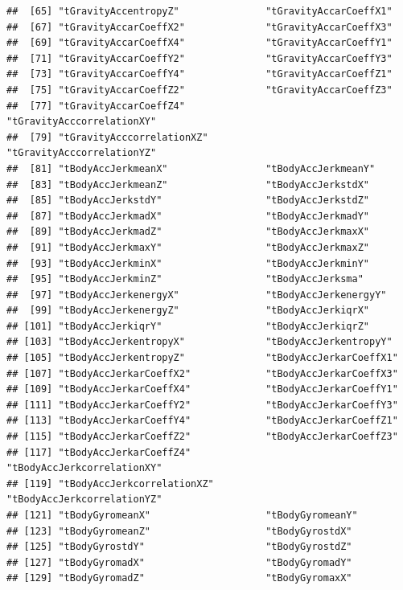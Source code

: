 \documentclass[
]{article}
\begin{document}
\begin{verbatim}
##  [65] "tGravityAccentropyZ"               "tGravityAccarCoeffX1"             
##  [67] "tGravityAccarCoeffX2"              "tGravityAccarCoeffX3"             
##  [69] "tGravityAccarCoeffX4"              "tGravityAccarCoeffY1"             
##  [71] "tGravityAccarCoeffY2"              "tGravityAccarCoeffY3"             
##  [73] "tGravityAccarCoeffY4"              "tGravityAccarCoeffZ1"             
##  [75] "tGravityAccarCoeffZ2"              "tGravityAccarCoeffZ3"             
##  [77] "tGravityAccarCoeffZ4"              "tGravityAcccorrelationXY"         
##  [79] "tGravityAcccorrelationXZ"          "tGravityAcccorrelationYZ"         
##  [81] "tBodyAccJerkmeanX"                 "tBodyAccJerkmeanY"                
##  [83] "tBodyAccJerkmeanZ"                 "tBodyAccJerkstdX"                 
##  [85] "tBodyAccJerkstdY"                  "tBodyAccJerkstdZ"                 
##  [87] "tBodyAccJerkmadX"                  "tBodyAccJerkmadY"                 
##  [89] "tBodyAccJerkmadZ"                  "tBodyAccJerkmaxX"                 
##  [91] "tBodyAccJerkmaxY"                  "tBodyAccJerkmaxZ"                 
##  [93] "tBodyAccJerkminX"                  "tBodyAccJerkminY"                 
##  [95] "tBodyAccJerkminZ"                  "tBodyAccJerksma"                  
##  [97] "tBodyAccJerkenergyX"               "tBodyAccJerkenergyY"              
##  [99] "tBodyAccJerkenergyZ"               "tBodyAccJerkiqrX"                 
## [101] "tBodyAccJerkiqrY"                  "tBodyAccJerkiqrZ"                 
## [103] "tBodyAccJerkentropyX"              "tBodyAccJerkentropyY"             
## [105] "tBodyAccJerkentropyZ"              "tBodyAccJerkarCoeffX1"            
## [107] "tBodyAccJerkarCoeffX2"             "tBodyAccJerkarCoeffX3"            
## [109] "tBodyAccJerkarCoeffX4"             "tBodyAccJerkarCoeffY1"            
## [111] "tBodyAccJerkarCoeffY2"             "tBodyAccJerkarCoeffY3"            
## [113] "tBodyAccJerkarCoeffY4"             "tBodyAccJerkarCoeffZ1"            
## [115] "tBodyAccJerkarCoeffZ2"             "tBodyAccJerkarCoeffZ3"            
## [117] "tBodyAccJerkarCoeffZ4"             "tBodyAccJerkcorrelationXY"        
## [119] "tBodyAccJerkcorrelationXZ"         "tBodyAccJerkcorrelationYZ"        
## [121] "tBodyGyromeanX"                    "tBodyGyromeanY"                   
## [123] "tBodyGyromeanZ"                    "tBodyGyrostdX"                    
## [125] "tBodyGyrostdY"                     "tBodyGyrostdZ"                    
## [127] "tBodyGyromadX"                     "tBodyGyromadY"                    
## [129] "tBodyGyromadZ"                     "tBodyGyromaxX"                    

\end{verbatim}
\end{document}
